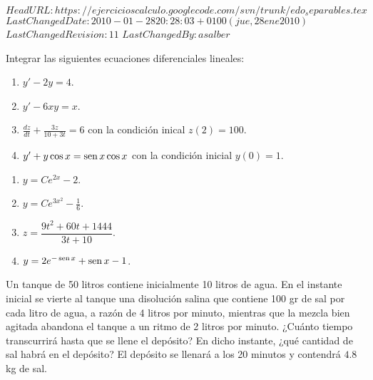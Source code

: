 \svnidlong
{$HeadURL: https://ejercicioscalculo.googlecode.com/svn/trunk/edo_separables.tex $}
{$LastChangedDate: 2010-01-28 20:28:03 +0100 (jue, 28 ene 2010) $}
{$LastChangedRevision: 11 $}
{$LastChangedBy: asalber $}
%
{Integrar las siguientes ecuaciones diferenciales lineales:
\begin{enumerate}
\item $y'-2y=4$.
\item $y'-6xy=x$.
\item $\frac{dz}{dt}+\frac{3z}{10+3t}=6$ con la condición inical $z(2)=100$.
\item $y'+y\cos x=\operatorname{sen} x\cos x$ con la condición inicial $y(0)=1$.
\end{enumerate}
}
{
\begin{enumerate}
\item $y=Ce^{2x}-2$.
\item $y=Ce^{3x^2}-\frac{1}{6}$.
\item $z=\dfrac{9t^2+60t+1444}{3t+10}$.
\item $y=2e^{-\operatorname{sen} x}+\operatorname{sen} x -1$.
\end{enumerate}
}
{}


{Un tanque de 50 litros contiene inicialmente 10 litros de agua. En el instante inicial se vierte al tanque una disolución salina que
contiene 100 gr de sal por cada litro de agua, a razón de 4 litros por minuto, mientras que la mezcla bien agitada abandona el tanque a un
ritmo de 2 litros por minuto. ¿Cuánto tiempo transcurrirá hasta que se llene el depósito? En dicho instante, ¿qué cantidad de sal habrá en
el depósito?}
{El depósito se llenará a los 20 minutos y contendrá $4.8$ kg de sal. 
}
{}


{}